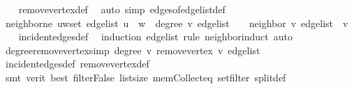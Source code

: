 \begin{isabellebody}
%
\isadelimproof
\ \ %
\endisadelimproof
%
\isatagproof
{}\isamarkupfalse%
\ remove{\isacharunderscore}{\kern0pt}vertex{\isacharunderscore}{\kern0pt}def\ \isamarkupfalse%
\ {\isacharparenleft}{\kern0pt}auto\ simp{\isacharcolon}{\kern0pt}\ edges{\isacharunderscore}{\kern0pt}of{\isacharunderscore}{\kern0pt}edge{\isacharunderscore}{\kern0pt}list{\isacharunderscore}{\kern0pt}def{\isacharparenright}{\kern0pt}%
\endisatagproof
{\isafoldproof}%
%
\isadelimproof
\isanewline
%
\endisadelimproof
\isanewline
{}\isamarkupfalse%
\ neighbor{\isacharunderscore}{\kern0pt}ne{\isacharcolon}{\kern0pt}\ {\isachardoublequoteopen}{\isasymforall}{\isacharparenleft}{\kern0pt}u{\isacharcomma}{\kern0pt}w{\isacharparenright}{\kern0pt}{\isasymin}set\ edge{\isacharunderscore}{\kern0pt}list{\isachardot}{\kern0pt}\ u\ {\isasymnoteq}\ w\ {\isasymLongrightarrow}\ degree\ v\ edge{\isacharunderscore}{\kern0pt}list\ {\isasymge}\ {}\ {\isasymLongrightarrow}\ neighbor\ v\ edge{\isacharunderscore}{\kern0pt}list\ {\isasymnoteq}\ v{\isachardoublequoteclose}\isanewline
%
\isadelimproof
\ \ %
\endisadelimproof
%
\isatagproof
{}\isamarkupfalse%
\ incident{\isacharunderscore}{\kern0pt}edges{\isacharunderscore}{\kern0pt}def\ \isamarkupfalse%
\ {\isacharparenleft}{\kern0pt}induction\ edge{\isacharunderscore}{\kern0pt}list\ rule{\isacharcolon}{\kern0pt}\ neighbor{\isachardot}{\kern0pt}induct{\isacharparenright}{\kern0pt}\ auto%
\endisatagproof
{\isafoldproof}%
%
\isadelimproof
\isanewline
%
\endisadelimproof
\isanewline
{}\isamarkupfalse%
\ degree{\isacharunderscore}{\kern0pt}remove{\isacharunderscore}{\kern0pt}vertex{\isacharunderscore}{\kern0pt}{}{\isacharbrackleft}{\kern0pt}simp{\isacharbrackright}{\kern0pt}{\isacharcolon}{\kern0pt}\ {\isachardoublequoteopen}degree\ v\ {\isacharparenleft}{\kern0pt}remove{\isacharunderscore}{\kern0pt}vertex\ v\ edge{\isacharunderscore}{\kern0pt}list{\isacharparenright}{\kern0pt}\ {\isacharequal}{\kern0pt}\ {}{\isachardoublequoteclose}\isanewline
%
\isadelimproof
\ \ %
\endisadelimproof
%
\isatagproof
{}\isamarkupfalse%
\ incident{\isacharunderscore}{\kern0pt}edges{\isacharunderscore}{\kern0pt}def\ remove{\isacharunderscore}{\kern0pt}vertex{\isacharunderscore}{\kern0pt}def\isanewline
\ \ \isamarkupfalse%
\ {\isacharparenleft}{\kern0pt}smt\ {\isacharparenleft}{\kern0pt}verit{\isacharcomma}{\kern0pt}\ best{\isacharparenright}{\kern0pt}\ filter{\isacharunderscore}{\kern0pt}False\ list{\isachardot}{\kern0pt}size{\isacharparenleft}{\kern0pt}{}{\isacharparenright}{\kern0pt}\ mem{\isacharunderscore}{\kern0pt}Collect{\isacharunderscore}{\kern0pt}eq\ set{\isacharunderscore}{\kern0pt}filter\ split{\isacharunderscore}{\kern0pt}def{\isacharparenright}{\kern0pt}%

\end{isabellebody}
